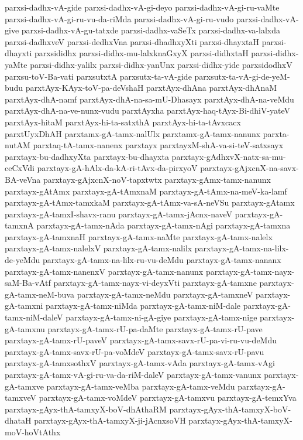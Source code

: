 {parxsi-dadhx-vA-gide
parxsi-dadhx-vA-gi-deyo
parxsi-dadhx-vA-gi-ru-vaMte
parxsi-dadhx-vA-gi-ru-vu-da-riMda
parxsi-dadhx-vA-gi-ru-vudo
parxsi-dadhx-vA-give
parxsi-dadhx-vA-gu-tatxde
parxsi-dadhx-vaSeTx
parxsi-dadhx-va-lalxda
parxsi-dadhxveV
parxsi-dedhxVna
parxsi-dhadhxyXti
parxsi-dhayxtaH
parxsi-dhayxti
parxsididhx
parxsi-didhx-mu-lalxknaGxyX
parxsi-didhxtaH
parxsi-didhx-yaMte
parxsi-didhx-yalilx
parxsi-didhx-yanUnx
parxsi-didhx-yide
parxsidodhxV
parxsu-toV-Ba-vati
parxsutxtA
parxsutx-ta-vA-gide
parxsutx-ta-vA-gi-de-yeM-budu
parxtAyx-KAyx-toV-pa-deVshaH
parxtAyx-dhAna
parxtAyx-dhAnaM
parxtAyx-dhA-namf
parxtAyx-dhA-na-sa-mU-Dhasayx
parxtAyx-dhA-na-veMdu
parxtAyx-dhA-na-ve-nunx-vudu
parxtAyxha
parxtAyx-haq-tAyx-Bi-dhiV-yateV
parxtAyx-hitaM
parxtAyx-hi-ta-satxthA
parxtAyx-hi-ta-tAvxcacx
parxtUyxDhAH
parxtamx-gA-tamx-nalUlx
parxtamx-gA-tamx-nanunx
parxta-nutAM
parxtaq-tA-tamx-nanenx
parxtayx
parxtayxM-shA-va-si-teV-satxsayx
parxtayx-bu-dadhxyXta
parxtayx-bu-dhayxta
parxtayx-gAdhxvX-natx-sa-mu-ceCxVdi
parxtayx-gA-hAlx-da-kA-ri-tAvx-da-pirxyoV
parxtayx-gAjxcnX-na-savx-BA-veVna
parxtayx-gAjxcnX-noV-tapxtwtx
parxtayx-gAmx-tamx-nanunx
parxtayx-gAtAmx
parxtayx-gA-tAmxnaM
parxtayx-gA-tAmx-na-meV-ka-lamf
parxtayx-gA-tAmx-tamxkaM
parxtayx-gA-tAmx-va-sA-neVSu
parxtayx-gAtamx
parxtayx-gA-tamxI-shavx-ranu
parxtayx-gA-tamx-jAcnx-naveV
parxtayx-gA-tamxnA
parxtayx-gA-tamx-nAda
parxtayx-gA-tamx-nAgi
parxtayx-gA-tamxna
parxtayx-gA-tamxnaH
parxtayx-gA-tamx-naMte
parxtayx-gA-tamx-nalelx
parxtayx-gA-tamx-nalelxV
parxtayx-gA-tamx-nalilx
parxtayx-gA-tamx-na-lilx-de-yeMdu
parxtayx-gA-tamx-na-lilx-ru-vu-deMdu
parxtayx-gA-tamx-nananx
parxtayx-gA-tamx-nanenxV
parxtayx-gA-tamx-nanunx
parxtayx-gA-tamx-nayx-saM-Ba-vAtf
parxtayx-gA-tamx-nayx-vi-deyxVti
parxtayx-gA-tamxne
parxtayx-gA-tamx-neM-buva
parxtayx-gA-tamx-neMdu
parxtayx-gA-tamxneV
parxtayx-gA-tamxni
parxtayx-gA-tamx-niMda
parxtayx-gA-tamx-niM-dale
parxtayx-gA-tamx-niM-daleV
parxtayx-gA-tamx-ni-gA-giye
parxtayx-gA-tamx-nige
parxtayx-gA-tamxnu
parxtayx-gA-tamx-rU-pa-daMte
parxtayx-gA-tamx-rU-pave
parxtayx-gA-tamx-rU-paveV
parxtayx-gA-tamx-savx-rU-pa-vi-ru-vu-deMdu
parxtayx-gA-tamx-savx-rU-pa-voMdeV
parxtayx-gA-tamx-savx-rU-pavu
parxtayx-gA-tamxsothxV
parxtayx-gA-tamx-vAda
parxtayx-gA-tamx-vAgi
parxtayx-gA-tamx-vA-gi-ru-va-da-riM-daleV
parxtayx-gA-tamx-vanunx
parxtayx-gA-tamxve
parxtayx-gA-tamx-veMba
parxtayx-gA-tamx-veMdu
parxtayx-gA-tamxveV
parxtayx-gA-tamx-voMdeV
parxtayx-gA-tamxvu
parxtayx-gA-temxYva
parxtayx-gAyx-thA-tamxyX-boV-dhAthaRM
parxtayx-gAyx-thA-tamxyX-boV-dhataH
parxtayx-gAyx-thA-tamxyX-ji-jAcnxsoVH
parxtayx-gAyx-thA-tamxyX-moV-hoVtAthx
}
